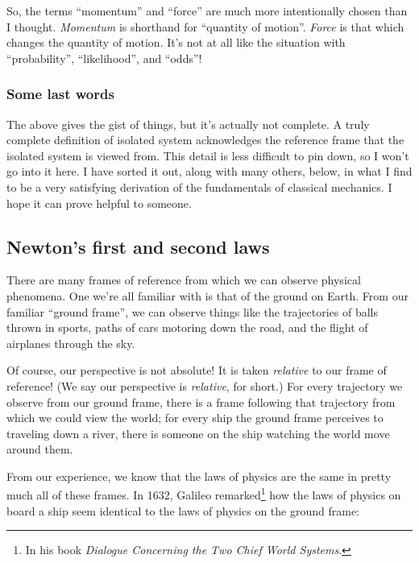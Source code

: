 \documentclass{article}
\begin{document}
So, the terms ``momentum'' and ``force'' are much more intentionally chosen than I thought. \textit{Momentum} is shorthand for ``quantity of motion''. \textit{Force} is that which changes the quantity of motion. It’s not at all like the situation with ``probability'', ``likelihood'', and ``odds''!

\subsubsection*{Some last words}

The above gives the gist of things, but it's actually not complete. A truly complete definition of isolated system acknowledges the reference frame that the isolated system is viewed from. This detail is less difficult to pin down, so I won't go into it here. I have sorted it out, along with many others, below, in what I find to be a very satisfying derivation of the fundamentals of classical mechanics. I hope it can prove helpful to someone.

\newpage

\subsection*{Newton's first and second laws}

There are many frames of reference from which we can observe physical phenomena. One we're all familiar with is that of the ground on Earth. From our familiar ``ground frame'', we can observe things like the trajectories of balls thrown in sports, paths of cars motoring down the road, and the flight of airplanes through the sky. 

Of course, our perspective is not absolute! It is taken \textit{relative} to our frame of reference! (We say our perspective is \textit{relative}, for short.) For every trajectory we observe from our ground frame, there is a frame following that trajectory from which we could view the world; for every ship the ground frame perceives to traveling down a river, there is someone on the ship watching the world move around them. 

From our experience, we know that the laws of physics are the same in pretty much all of these frames. In 1632, Galileo remarked\footnote{In his book \textit{Dialogue Concerning the Two Chief World Systems}.} how the laws of physics on board a ship seem identical to the laws of physics on the ground frame:
\end{document}
